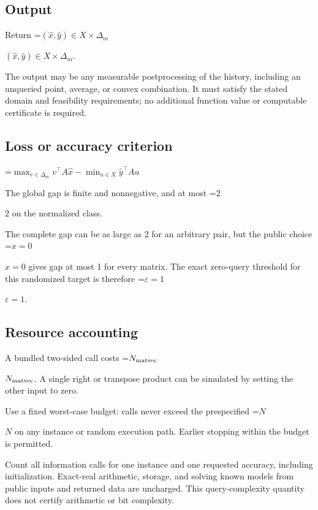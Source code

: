 \documentclass[10pt,a4paper]{article}
\newcommand{\AtlasMath}[1]{\par\begingroup\centering\setbox0=\hbox{$\displaystyle #1$}\ifdim\wd0>1.4\linewidth\typeout{ATLAS WIDE FORMULA: \the\wd0}\fi\ifdim\wd0>\linewidth\resizebox{\linewidth}{!}{\box0}\else\box0\fi\par\endgroup}
\newcommand{\AtlasInlineMath}[1]{\begingroup\setbox0=\hbox{$#1$}\ifdim\wd0>.4\linewidth\endgroup\AtlasMath{#1}\else\endgroup$#1$\fi}
\begin{document}
\subsection{Output}


Return \AtlasInlineMath{(\widehat{x},\widehat{y})\in X\times\Delta_m}.



The output may be any measurable postprocessing of the history, including an unqueried point, average, or convex combination. It must satisfy the stated domain and feasibility requirements; no additional function value or computable certificate is required.



\subsection{Loss or accuracy criterion}



\AtlasMath{\max_{v\in\Delta_m}v^\top A\widehat{x}-\min_{u\in X}\widehat{y}^\top Au}




The global gap is finite and nonnegative, and at most \AtlasInlineMath{2} on the normalized class.



The complete gap can be as large as 2 for an arbitrary pair, but the public choice \AtlasInlineMath{x=0} gives gap at most 1 for every matrix. The exact zero-query threshold for this randomized target is therefore \AtlasInlineMath{\varepsilon=1}.



\subsection{Resource accounting}


A bundled two-sided call costs \AtlasInlineMath{N_{\rm matvec}}. A single right or transpose product can be simulated by setting the other input to zero.



Use a fixed worst-case budget: calls never exceed the prespecified \AtlasInlineMath{N} on any instance or random execution path. Earlier stopping within the budget is permitted.



Count all information calls for one instance and one requested accuracy, including initialization. Exact-real arithmetic, storage, and solving known models from public inputs and returned data are uncharged. This query-complexity quantity does not certify arithmetic or bit complexity.
\end{document}
